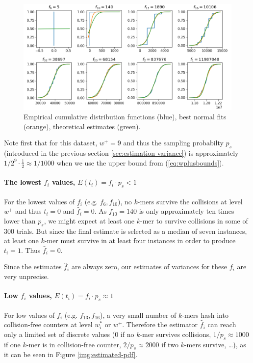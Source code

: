 \begin{figure}[h!]
\centerline{\includegraphics[width=1\textwidth, trim={0cm, 0.1cm, 0cm, 0cm}, clip]{images/cdf2.png}}
\caption[Distribution functions of $\hat f_i$]{Empirical cumulative distribution functions (blue), 
best normal fits (orange), theoretical estimates (green).}
\label{img:estimated-cdf}
\end{figure}

Note first that for this dataset, $w^+ = 9$ and thus the sampling probabilty $p_s$
(introduced in the previous section \ref{sec:estimation-variance}) is approximately
$1/2^9 \cdot \frac{1}{2} \approx 1/1000 $ when we use the upper bound from (\ref{eq:wplusbounds}).

\paragraph{The lowest $f_i$ values, $E(t_i) = f_i \cdot p_s < 1$}
For the lowest values of $f_i$ (e.g. $f_6, f_{10}$), 
no $k$-mers survive the collisions at level $w^+$ and thus $t_i = 0$ and $\hat f_i = 0$. 
As $f_{10}=140$ is only approximately ten times lower than $p_s$, we might expect at least
one $k$-mer to survive collisions in some of 300 trials. But since the final estimate is selected
as a median of seven instances, at least one $k$-mer must survive in at least four instances
in order to produce $t_i = 1$. Thus $\hat f_i = 0$. 

Since the estimates $\hat f_i$ are always zero, our estimates of variances for these $f_i$ are 
very unprecise.

\paragraph{Low $f_i$ values, $E(t_i) = f_i \cdot p_s \approx 1$}
For low values of $f_i$ (e.g. $f_{13}, f_{16}$), a very small number of $k$-mers hash
into collision-free counters at level $w_i^*$ or $w^+$. Therefore the
estimator $\hat f_i$ can reach only a limited set of discrete 
values (0 if no $k$-mer survives collisions, $1/p_s \approx 1000$ if one $k$-mer is in
collision-free counter, $2/p_s \approx 2000$ if two $k$-mers survive, \dots), as it can
be seen in Figure \ref{img:estimated-pdf}.

